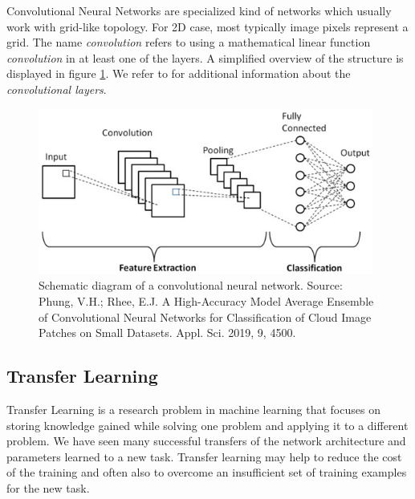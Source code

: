Convolutional Neural Networks are specialized kind of networks which usually work with grid-like topology. For 2D case, most typically image pixels represent a grid. The name \emph{convolution} refers to using a mathematical linear function \emph{convolution} in at least one of the layers. A simplified overview of the structure is displayed in figure \ref{fig:convolution_neural_network}. We refer to \cite{Goodfellow-et-al-2016} for additional information about the \emph{convolutional layers}.

\begin{figure}
    \centering
    \includegraphics[width=0.98\textwidth]{img/convolution_neural_network.jpg}
    \caption[Schematic diagram of a convolutional neural network]{Schematic diagram of a convolutional neural network. Source: Phung, V.H.; Rhee, E.J. A High-Accuracy Model Average Ensemble of Convolutional Neural Networks for Classification of Cloud Image Patches on Small Datasets. Appl. Sci. 2019, 9, 4500.}
    \label{fig:convolution_neural_network}
\end{figure}


\subsection{Transfer Learning}

Transfer Learning is a research problem in machine learning that focuses on storing knowledge gained while solving one problem and applying it to a different problem. We have seen many successful transfers of the network architecture and parameters learned to a new task. Transfer learning may help to reduce the cost of the training and often also to overcome an insufficient set of training examples for the new task.


